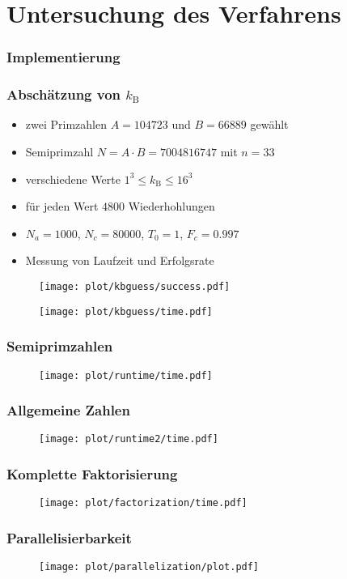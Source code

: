 \section{Untersuchung des Verfahrens}
\begin{frame}
  \frametitle{Implementierung}
\end{frame}

\begin{frame}[allowframebreaks]
  \frametitle{Abschätzung von $k_\mathrm{B}$}
  \begin{itemize}
    \item zwei Primzahlen $A=104723$ und $B=66889$ gewählt
    \item Semiprimzahl $N=A\cdot B=7004816747$ mit $n=33$
    \item verschiedene Werte $1^3\leq k_\mathrm{B}\leq 16^3$
    \item für jeden Wert $4800$ Wiederhohlungen
    \item $N_a=1000$, $N_c=80000$, $T_0=1$, $F_c=0.997$
    \item Messung von Laufzeit und Erfolgsrate
  \end{itemize}
  \begin{figure}[H]
    \centering
    \texttt{[image: plot/kbguess/success.pdf]}
  \end{figure}
  \begin{figure}[H]
    \centering
    \texttt{[image: plot/kbguess/time.pdf]}
  \end{figure}
\end{frame}

\begin{frame}
  \frametitle{Semiprimzahlen}
  \begin{figure}[H]
    \centering
    \texttt{[image: plot/runtime/time.pdf]}
  \end{figure}
\end{frame}
\begin{frame}
  \frametitle{Allgemeine Zahlen}
  \begin{figure}[H]
    \centering
    \texttt{[image: plot/runtime2/time.pdf]}
  \end{figure}
\end{frame}

\begin{frame}
  \frametitle{Komplette Faktorisierung}
  \begin{figure}[H]
    \centering
    \texttt{[image: plot/factorization/time.pdf]}
  \end{figure}
\end{frame}

\begin{frame}
  \frametitle{Parallelisierbarkeit}
  \begin{figure}[H]
    \centering
    \texttt{[image: plot/parallelization/plot.pdf]}
  \end{figure}
\end{frame}
